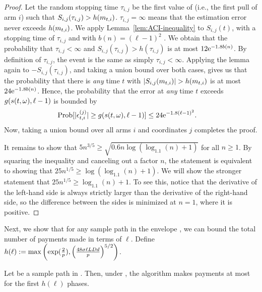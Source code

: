 \begin{proof}
Let the random stopping time $\tau_{i,j}$ be the first value of
 (i.e., the first pull of arm $i$) such that 
$S_{i,j}(\tau_{i,j}) > h(m_{t,i})$.
$\tau_{i,j} = \infty$ means that the estimation error never exceeds 
$h(m_{t,i})$.
We apply Lemma~\ref{lem:ACI-inequality}
to $S_{i,j}(t)$, with a stopping time of $\tau_{i,j}$ and
with $b(n) = (\ell-1)^2$ .
We obtain that the probability that $\tau_{i,j} < \infty$ and 
$S_{i,j}(\tau_{i,j}) > h(\tau_{i,j})$ is at most
$12 \mathrm{e}^{-1.8 b(n)}$.
By definition of $\tau_{i,j}$, the event is the same as simply
$\tau_{i,j} < \infty$.
Applying the lemma again to $-S_{i,j}(\tau_{i,j})$,
and taking a union bound over both cases,
gives us that the probability that there is \emph{any} time $t$ with
$|S_{i,j}(m_{t,i})| > h (m_{t,i})$
is at most $24 \mathrm{e}^{-1.8 b(n)}$.
Hence, the probability that the error at \emph{any} time $t$ exceeds
$g(s(t,\omega), \ell-1)$ is bounded by 
\begin{align*}
\Prob{|\Err{t}{i}{j}| \geq g(s(t,\SP), \ell-1)}
& \leq 24 \e^{-1.8(\ell-1)^2}.
\end{align*}
Now, taking a union bound over all arms $i$ and
coordinates $j$ completes the proof.

It remains to show that
$5 n^{3/5} \geq \sqrt{0.6n \log(\log_{1.1}(n)+1)}$
for all $n \geq 1$.
By squaring the inequality and canceling out a factor $n$,
the statement is equivalent to showing that
$25 n^{1/5} \geq \log(\log_{1.1}(n)+1)$.
We will show the stronger statement that
$25 n^{1/5} \geq \log_{1.1}(n)+1$.  
To see this, notice that the derivative of the left-hand side is
always strictly larger than the derivative of the right-hand side,
so the difference between the sides is minimized at $n=1$,
where it is positive. 
\end{proof}

Next, we show that for any sample path \SP in the envelope \Env{\ell},
we can bound the total number of payments made in terms of $\ell$.
Define $h(\ell) := \max \left( \exp(\frac{2}{p}),
\left( \frac{48 \sigma \ell L D d}{p} \right)^{5/2}
\right)$.

\begin{lemma} \label{lem:envelope-payments}
Let \SP be a sample path in \Env{\ell}.
Then, under \SP, the algorithm makes payments at most for the first 
$h(\ell)$ phases. 
\end{lemma}

